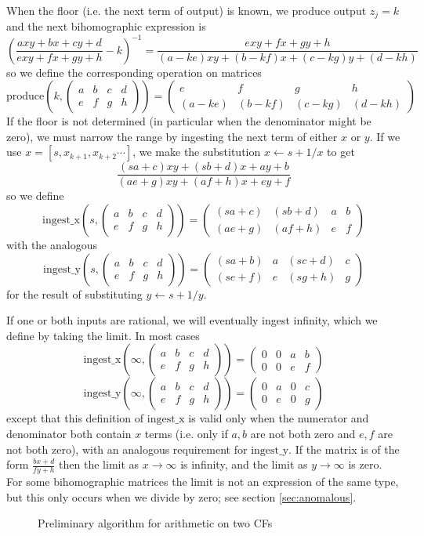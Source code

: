 \documentclass[11pt, oneside]{amsart}   	%
\newcommand{\bihomographic}[8]{\left(\begin{smallmatrix}#1&#2&#3&#4\\#5&#6&#7&#8\end{smallmatrix}\right)}
\newcommand{\abcd}{\left(
\begin{smallmatrix} 
a & b & c & d\\ 
e & f & g & h
\end{smallmatrix}
\right)}
\renewcommand{\:}{\negthickspace:\negthickspace}
\begin{document}
When the floor (i.e. the next term of output) is known, we produce output $z_j=k$ and the next bihomographic expression is
\[
\left(\frac{axy + bx + cy + d}{exy + fx + gy + h} - k\right)^{-1} = \frac{exy + fx + gy + h}{(a-ke)xy + (b-kf)x + (c-kg)y + (d-kh)}
\]
so we define the corresponding operation on matrices
\[
\mbox{produce}(k, \abcd) = \bihomographic{e}{f}{g}{h}{(a-ke)}{(b-kf)}{(c-kg)}{(d-kh)}
\]
 If the floor is not determined (in particular when the denominator might be zero), we must narrow the range by ingesting the next term of either $x$ or $y$.
 If we use $x = [s,x_{k+1},x_{k+2}\cdots]$, we make the substitution $x \leftarrow s + 1/x$ to get
\[
\frac{(sa+c)xy + (sb+d)x + ay + b}{(ae+g)xy + (af+h)x + ey + f}
\]
so we define
\[
\mbox{ingest\_x}(s, \abcd) = \bihomographic{(sa+c)}{(sb+d)}{a}{b} {(ae+g)}{(af+h)}{e}{f}
\]
with the analogous 
\[
\mbox{ingest\_y}(s, \abcd) = \bihomographic{(sa+b)}{a}{(sc+d)}{c}{(se+f)}{e}{(sg+h)}{g}
\]
for the result of substituting $y \leftarrow s + 1/y$.

If one or both inputs are rational, we will eventually ingest infinity, which we define by taking the limit. In most cases
\[
\mbox{ingest\_x}(\infty, \abcd) = \bihomographic{0}{0}{a}{b} {0}{0}{e}{f}
\]
\[
\mbox{ingest\_y}(\infty, \abcd) = \bihomographic{0}{a}{0}{c}{0}{e}{0}{g}
\]
except that this definition of $\mbox{ingest\_x}$ is valid only when the numerator and denominator both contain $x$ terms
(i.e. only if $a,b$ are not both zero and $e,f$ are not both zero), with an analogous requirement for $\mbox{ingest\_y}$.
If the matrix is of the form $\frac{bx+d}{fy+h}$ then the limit as $x \to \infty$ is infinity, %
and the limit as $y \to \infty$  is zero. 
For some bihomographic matrices the limit is not an expression of the same type, but this only occurs when we divide by zero; see section \ref{sec:anomalous}.

\begin{figure}\label{fig:twoCFarithPrelim}
\begin{algorithmic}
 
 
\STATE{$M \gets \abcd$} 
           \ENDWHILE
\ENDWHILE
\end{algorithmic}
\caption{Preliminary algorithm for arithmetic on two CFs}
\end{figure}
\end{document}
